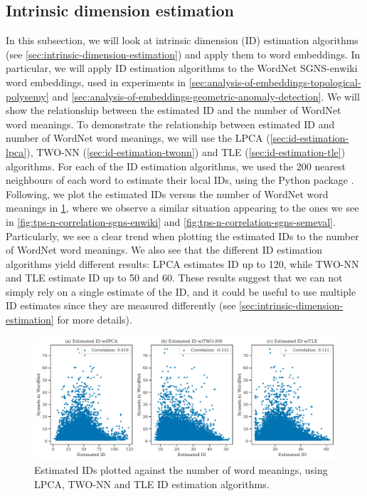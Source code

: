 \subsection{Intrinsic dimension estimation}
\label{sec:analysis-of-embeddings-intrinsic-dimension-estimation}
In this subsection, we will look at intrinsic dimension (ID) estimation algorithms (see \cref{sec:intrinsic-dimension-estimation}) and apply them to word embeddings. In particular, we will apply ID estimation algorithms to the WordNet SGNS-enwiki word embeddings, used in experiments in \cref{sec:analysis-of-embeddings-topological-polysemy} and \cref{sec:analysis-of-embeddings-geometric-anomaly-detection}. We will show the relationship between the estimated ID and the number of WordNet word meanings. To demonstrate the relationship between estimated ID and number of WordNet word meanings, we will use the LPCA (\cref{sec:id-estimation-lpca}), TWO-NN (\cref{sec:id-estimation-twonn}) and TLE (\cref{sec:id-estimation-tle}) algorithms. For each of the ID estimation algorithms, we used the 200 nearest neighbours of each word to estimate their local IDs, using the  Python package \cite{scikitdimension2020}. Following, we plot the estimated IDs versus the number of WordNet word meanings in \cref{fig:intrinsic-dimension-estimation-vs-wordnet-synsets}, where we observe a similar situation appearing to the ones we see in \cref{fig:tps-n-correlation-sgns-enwiki} and \cref{fig:tps-n-correlation-sgns-semeval}. Particularly, we see a clear trend when plotting the estimated IDs to the number of WordNet word meanings. We also see that the different ID estimation algorithms yield different results: LPCA estimates ID up to 120, while TWO-NN and TLE estimate ID up to 50 and 60. These results suggest that we can not simply rely on a single estimate of the ID, and it could be useful to use multiple ID estimates since they are measured differently (see \cref{sec:intrinsic-dimension-estimation} for more details).
\begin{figure}[H]
    \centering
    \includegraphics[width=\textwidth]{thesis/figures/intrinsic-dimension-estimation-vs-wordnet-synsets.pdf}
    \caption{Estimated IDs plotted against the number of word meanings, using LPCA, TWO-NN and TLE ID estimation algorithms.}
    \label{fig:intrinsic-dimension-estimation-vs-wordnet-synsets}
\end{figure}

